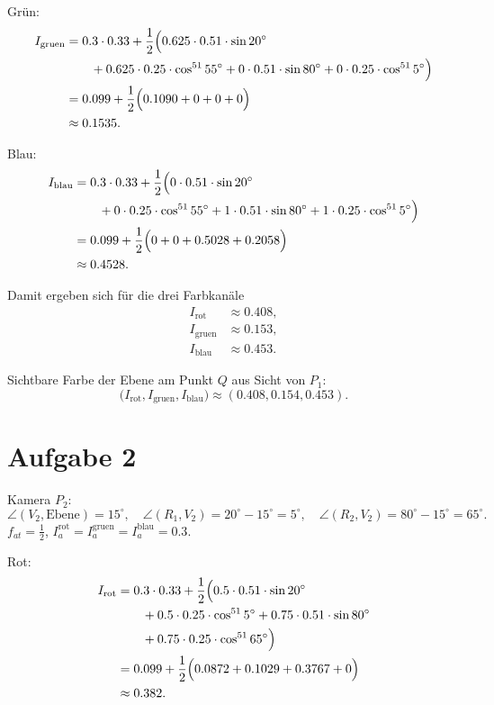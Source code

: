 \documentclass[11pt,a4paper]{article}
\begin{document}
Grün:
\[
\begin{aligned}
I_{\mathrm{gruen}}
&= 0.3 \cdot 0.33
 + \frac{1}{2}\Bigl(
 0.625 \cdot 0.51 \cdot \sin 20^\circ \\
&\qquad + 0.625 \cdot 0.25 \cdot \cos^{51} 55^\circ
 + 0 \cdot 0.51 \cdot \sin 80^\circ
 + 0 \cdot 0.25 \cdot \cos^{51} 5^\circ
\Bigr) \\
&= 0.099
 + \frac{1}{2}\Bigl(0.1090 + 0 + 0 + 0\Bigr) \\
&\approx 0.1535.
\end{aligned}
\]

Blau:
\[
\begin{aligned}
I_{\mathrm{blau}}
&= 0.3 \cdot 0.33
 + \frac{1}{2}\Bigl(
 0 \cdot 0.51 \cdot \sin 20^\circ \\
&\qquad + 0 \cdot 0.25 \cdot \cos^{51} 55^\circ
 + 1 \cdot 0.51 \cdot \sin 80^\circ
 + 1 \cdot 0.25 \cdot \cos^{51} 5^\circ
\Bigr) \\
&= 0.099
 + \frac{1}{2}\Bigl(0 + 0 + 0.5028 + 0.2058\Bigr) \\
&\approx 0.4528.
\end{aligned}
\]

Damit ergeben sich für die drei Farbkanäle
\[
\begin{aligned}
I_{\mathrm{rot}} &\approx 0.408, \\
I_{\mathrm{gruen}} &\approx 0.153, \\
I_{\mathrm{blau}} &\approx 0.453.
\end{aligned}
\]

Sichtbare Farbe der Ebene am Punkt $Q$ aus Sicht von $P_1$:
\[
\bigl(I_{\mathrm{rot}}, I_{\mathrm{gruen}}, I_{\mathrm{blau}}\bigr)
\approx (0.408, 0.154, 0.453).
\]

\section{Aufgabe 2}
Kamera $P_2$:
\[
\angle(V_2,\text{Ebene})=15^\circ,
\quad \angle(R_1,V_2)=20^\circ-15^\circ=5^\circ,
\quad \angle(R_2,V_2)=80^\circ-15^\circ=65^\circ.
\]
$f_{at} = \frac{1}{2}$, $I_a^{\mathrm{rot}} = I_a^{\mathrm{gruen}} = I_a^{\mathrm{blau}} = 0.3$.

Rot:
\[
\begin{aligned}
I_{\mathrm{rot}}
&= 0.3 \cdot 0.33
 + \frac{1}{2}\Bigl(
 0.5 \cdot 0.51 \cdot \sin 20^\circ \\
&\qquad + 0.5 \cdot 0.25 \cdot \cos^{51} 5^\circ
 + 0.75 \cdot 0.51 \cdot \sin 80^\circ \\
&\qquad + 0.75 \cdot 0.25 \cdot \cos^{51} 65^\circ
\Bigr) \\
&= 0.099
 + \frac{1}{2}\Bigl(0.0872 + 0.1029 + 0.3767 + 0\Bigr) \\
&\approx 0.382.
\end{aligned}
\]
\end{document}
